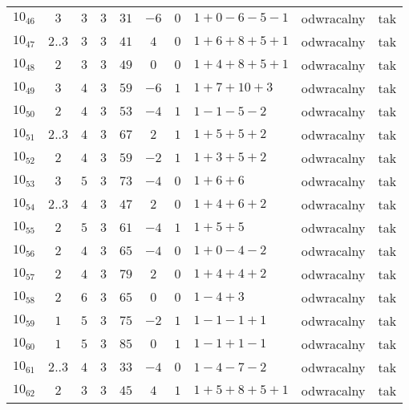 \begin{longtable}{lccccccllc}
$10_{46}$   &  $3$     &  $3$  &  $3$      &  $31$   &  $-6$  &  $0$  &  $1+0-6-5-1$    &  odwracalny  &  tak  \\
$10_{47}$   &  $2..3$  &  $3$  &  $3$      &  $41$   &  $4$   &  $0$  &  $1+6+8+5+1$    &  odwracalny  &  tak  \\
$10_{48}$   &  $2$     &  $3$  &  $3$      &  $49$   &  $0$   &  $0$  &  $1+4+8+5+1$    &  odwracalny  &  tak  \\
$10_{49}$   &  $3$     &  $4$  &  $3$      &  $59$   &  $-6$  &  $1$  &  $1+7+10+3$     &  odwracalny  &  tak  \\
$10_{50}$   &  $2$     &  $4$  &  $3$      &  $53$   &  $-4$  &  $1$  &  $1-1-5-2$      &  odwracalny  &  tak  \\
$10_{51}$   &  $2..3$  &  $4$  &  $3$      &  $67$   &  $2$   &  $1$  &  $1+5+5+2$      &  odwracalny  &  tak  \\
$10_{52}$   &  $2$     &  $4$  &  $3$      &  $59$   &  $-2$  &  $1$  &  $1+3+5+2$      &  odwracalny  &  tak  \\
$10_{53}$   &  $3$     &  $5$  &  $3$      &  $73$   &  $-4$  &  $0$  &  $1+6+6$        &  odwracalny  &  tak  \\
$10_{54}$   &  $2..3$  &  $4$  &  $3$      &  $47$   &  $2$   &  $0$  &  $1+4+6+2$      &  odwracalny  &  tak  \\
$10_{55}$   &  $2$     &  $5$  &  $3$      &  $61$   &  $-4$  &  $1$  &  $1+5+5$        &  odwracalny  &  tak  \\
$10_{56}$   &  $2$     &  $4$  &  $3$      &  $65$   &  $-4$  &  $0$  &  $1+0-4-2$      &  odwracalny  &  tak  \\
$10_{57}$   &  $2$     &  $4$  &  $3$      &  $79$   &  $2$   &  $0$  &  $1+4+4+2$      &  odwracalny  &  tak  \\
$10_{58}$   &  $2$     &  $6$  &  $3$      &  $65$   &  $0$   &  $0$  &  $1-4+3$        &  odwracalny  &  tak  \\
$10_{59}$   &  $1$     &  $5$  &  $3$      &  $75$   &  $-2$  &  $1$  &  $1-1-1+1$      &  odwracalny  &  tak  \\
$10_{60}$   &  $1$     &  $5$  &  $3$      &  $85$   &  $0$   &  $1$  &  $1-1+1-1$      &  odwracalny  &  tak  \\
$10_{61}$   &  $2..3$  &  $4$  &  $3$      &  $33$   &  $-4$  &  $0$  &  $1-4-7-2$      &  odwracalny  &  tak  \\
$10_{62}$   &  $2$     &  $3$  &  $3$      &  $45$   &  $4$   &  $1$  &  $1+5+8+5+1$    &  odwracalny  &  tak  \\

\end{longtable}
